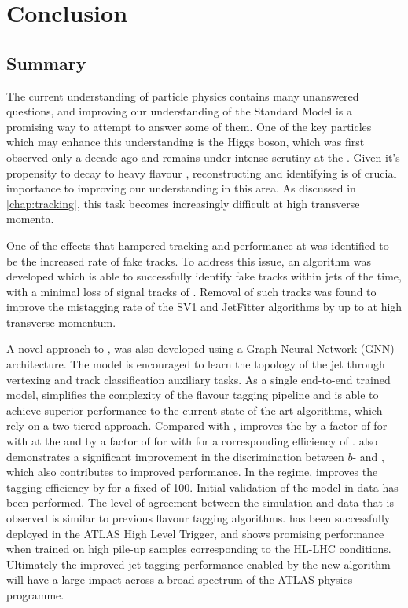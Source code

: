 \chapter{Conclusion}
\label{chap:conclusion}

\section{Summary}\label{sec:conc-summary}

The current understanding of particle physics contains many unanswered questions, and improving our understanding of the Standard Model is a promising way to attempt to answer some of them.
One of the key particles which may enhance this understanding is the Higgs boson, which was first observed only a decade ago and remains under intense scrutiny at the \LHC.
Given it's propensity to decay to heavy flavour \bquarks, reconstructing and identifying \bjets is of crucial importance to improving our understanding in this area.
As discussed in \cref{chap:tracking}, this task becomes increasingly difficult at high transverse momenta.

One of the effects that hampered tracking and \btagging performance at \highpt was identified to be the increased rate of fake tracks.
To address this issue, an algorithm was developed which is able to successfully identify fake tracks within jets  of the time, with a minimal loss of signal tracks of .
Removal of such tracks was found to improve the \ljet mistagging rate of the SV1 and JetFitter algorithms by up to  at high transverse momentum.

A novel approach to \btagging, \GNN was also developed using a Graph Neural Network (GNN) architecture.
The model is encouraged to learn the topology of the jet through vertexing and track classification auxiliary tasks.
As a single end-to-end trained model, \GNN simplifies the complexity of the flavour tagging pipeline and is able to achieve superior performance to the current state-of-the-art algorithms, which rely on a two-tiered approach.
Compared with \DLr, \GNN improves the \lrej by a factor of \ttbllo for \ttbarjets with \ttbarpt at the  and by a factor of \zpbllo for \Zprimejets with \Zprimept for a corresponding \bjet efficiency of .
\GNN also demonstrates a significant improvement in the discrimination between $b$- and \cjets, which also contributes to improved \ctagging performance.
In the \highpt regime, \GNN improves the \bjet tagging efficiency by  for a fixed \lrej of 100.
Initial validation of the model in data has been performed.
The level of agreement between the simulation and data that is observed is similar to previous flavour tagging algorithms.
\GNN has been successfully deployed in the ATLAS High Level Trigger, and shows promising performance when trained on high pile-up samples corresponding to the HL-LHC conditions.
Ultimately the improved jet tagging performance enabled by the new algorithm will have a large impact across a broad spectrum of the ATLAS physics programme.

